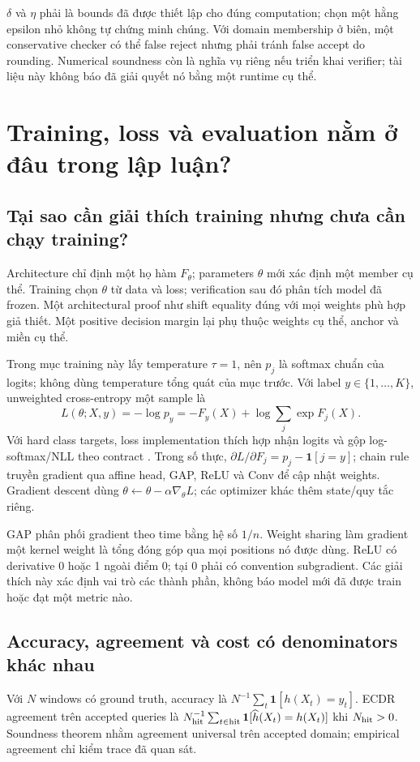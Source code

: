 \documentclass[11pt,a4paper]{article}
\theoremstyle{definition}
\begin{document}
$\delta$ và $\eta$ phải là bounds đã được thiết lập cho đúng computation;
chọn một hằng epsilon nhỏ không tự chứng minh chúng. Với domain
membership ở biên, một conservative checker có thể false reject nhưng
phải tránh false accept do rounding. Numerical soundness còn là nghĩa
vụ riêng nếu triển khai verifier; tài liệu này không báo đã giải quyết
nó bằng một runtime cụ thể.

\section{Training, loss và evaluation nằm ở đâu trong lập luận?}
\subsection{Tại sao cần giải thích training nhưng chưa cần chạy training?}
Architecture chỉ định một họ hàm $F_\theta$; parameters $\theta$ mới
xác định một member cụ thể. Training chọn $\theta$ từ data và loss;
verification sau đó phân tích model đã frozen. Một architectural proof
như shift equality đúng với mọi weights phù hợp giả thiết. Một positive
decision margin lại phụ thuộc weights cụ thể, anchor và miền cụ thể.

Trong mục training này lấy temperature $\tau=1$, nên $p_j$ là softmax
chuẩn của logits; không dùng temperature tổng quát của mục trước.
Với label $y\in\{1,\ldots,K\}$, unweighted cross-entropy một sample là
\begin{equation}
L(\theta;X,y)=-\log p_y
=-F_y(X)+\log\sum_j\exp F_j(X).
\end{equation}
Với hard class targets, loss implementation thích hợp nhận logits và
gộp log-softmax/NLL theo contract \cite{torchce}. Trong số thực,
$\partial L/\partial F_j=p_j-\mathbf1[j=y]$; chain rule truyền gradient
qua affine head, GAP, ReLU và Conv để cập nhật weights. Gradient descent
dùng $\theta\leftarrow\theta-\alpha\nabla_\theta L$; các optimizer khác
thêm state/quy tắc riêng.

GAP phân phối gradient theo time bằng hệ số $1/n$. Weight sharing làm
gradient một kernel weight là tổng đóng góp qua mọi positions nó được
dùng. ReLU có derivative 0 hoặc 1 ngoài điểm 0; tại 0 phải có convention
subgradient. Các giải thích này xác định vai trò các thành phần, không
báo model mới đã được train hoặc đạt một metric nào.

\subsection{Accuracy, agreement và cost có denominators khác nhau}
Với $N$ windows có ground truth, accuracy là
$N^{-1}\sum_t\mathbf1[h(X_t)=y_t]$. ECDR agreement trên accepted queries
là $N_{\rm hit}^{-1}\sum_{t\in\rm hit}\mathbf1[\widehat h(X_t)=h(X_t)]$
khi $N_{\rm hit}>0$. Soundness theorem nhằm agreement universal trên
accepted domain; empirical agreement chỉ kiểm trace đã quan sát.
\end{document}
